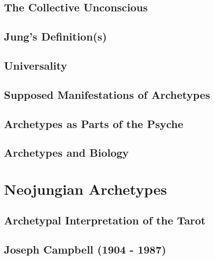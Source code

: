 \documentclass[
]{book}
\begin{document}
\hypertarget{the-collective-unconscious}{%
\subsection{The Collective Unconscious}\label{the-collective-unconscious}}

\hypertarget{jungs-definitions}{%
\subsection{Jung's Definition(s)}\label{jungs-definitions}}

\hypertarget{universality}{%
\subsection{Universality}\label{universality}}

\hypertarget{supposed-manifestations-of-archetypes}{%
\subsection{Supposed Manifestations of Archetypes}\label{supposed-manifestations-of-archetypes}}

\hypertarget{archetypes-as-parts-of-the-psyche}{%
\subsection{Archetypes as Parts of the Psyche}\label{archetypes-as-parts-of-the-psyche}}

\hypertarget{archetypes-and-biology}{%
\subsection{Archetypes and Biology}\label{archetypes-and-biology}}

\hypertarget{neojungian-archetypes}{%
\section{Neojungian Archetypes}\label{neojungian-archetypes}}

\hypertarget{archetypal-interpretation-of-the-tarot}{%
\subsection{Archetypal Interpretation of the Tarot}\label{archetypal-interpretation-of-the-tarot}}

\hypertarget{joseph-campbell-1904---1987}{%
\subsection{Joseph Campbell (1904 - 1987)}\label{joseph-campbell-1904---1987}}
\end{document}
